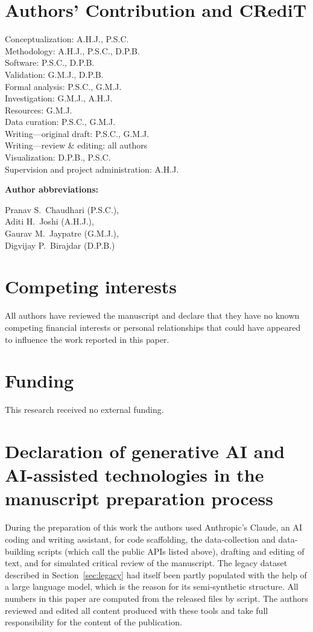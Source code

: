 \documentclass[11pt,a4paper]{article}
\DeclareRobustCommand*{\_}{\textunderscore\hskip0pt\relax}
\begin{document}
\section*{Authors' Contribution and CRediT}
\noindent Conceptualization: A.H.J., P.S.C.\\
\noindent Methodology: A.H.J., P.S.C., D.P.B.\\
\noindent Software: P.S.C., D.P.B.\\
\noindent Validation: G.M.J., D.P.B.\\
\noindent Formal analysis: P.S.C., G.M.J.\\
\noindent Investigation: G.M.J., A.H.J.\\
\noindent Resources: G.M.J.\\
\noindent Data curation: P.S.C., G.M.J.\\
\noindent Writing---original draft: P.S.C., G.M.J.\\
\noindent Writing---review \& editing: all authors\\
\noindent Visualization: D.P.B., P.S.C.\\
\noindent Supervision and project administration: A.H.J.

\medskip\noindent\textbf{Author abbreviations:}\par
\noindent Pranav S.\ Chaudhari (P.S.C.),\\
\noindent Aditi H.\ Joshi (A.H.J.),\\
\noindent Gaurav M.\ Jaypatre (G.M.J.),\\
\noindent Digvijay P.\ Birajdar (D.P.B.)

\section*{Competing interests}
All authors have reviewed the manuscript and declare that they have no known competing financial interests or personal relationships that could have appeared to influence the work reported in this paper.

\section*{Funding}
This research received no external funding.

\section*{Declaration of generative AI and AI-assisted technologies in the manuscript preparation process}
During the preparation of this work the authors used Anthropic's Claude, an AI coding and writing assistant, for code scaffolding, the data-collection and data-building scripts (which call the public APIs listed above), drafting and editing of text, and for simulated critical review of the manuscript. The legacy dataset described in Section~\ref{sec:legacy} had itself been partly populated with the help of a large language model, which is the reason for its semi-synthetic structure. All numbers in this paper are computed from the released files by script. The authors reviewed and edited all content produced with these tools and take full responsibility for the content of the publication.
\end{document}
